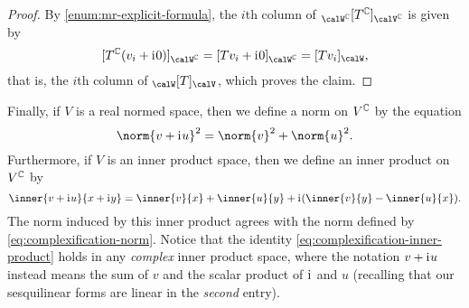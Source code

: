 \begin{proof}
    By \cref{enum:mr-explicit-formula}, the $i$th column of $\mr{\calW^\complex}{T^\complex}{\calV^\complex}$ is given by
    \begin{equation*}
        \coordvec{T^\complex (v_i + \iu 0)}{\calW^\complex}
            = \coordvec{Tv_i + \iu 0}{\calW^\complex}
            = \coordvec{Tv_i}{\calW},
    \end{equation*}
    that is, the $i$th column of $\mr{\calW}{T}{\calV}$, which proves the claim.
\end{proof}


Finally, if $V$ is a real normed space, then we define a norm on $V^{\mathbb{C}}$ by the equation
%
\begin{equation}
    \label{eq:complexification-norm}
    \norm{v + \iu u}^2
        = \norm{v}^2 + \norm{u}^2.
\end{equation}
%
Furthermore, if $V$ is an inner product space, then we define an inner product on $V^{\mathbb{C}}$ by
%
\begin{equation}
    \label{eq:complexification-inner-product}
    \inner{v + \iu u}{x + \iu y}
        = \inner{v}{x}
          + \inner{u}{y}
          + \iu (\inner{v}{y} - \inner{u}{x}).
\end{equation}
%
The norm induced by this inner product agrees with the norm defined by \cref{eq:complexification-norm}. Notice that the identity \cref{eq:complexification-inner-product} holds in any \emph{complex} inner product space, where the notation $v + \mathrm{i}\mkern1mu u$ instead means the sum of $v$ and the scalar product of $\mathrm{i}\mkern1mu$ and $u$ (recalling that our sesquilinear forms are linear in the \emph{second} entry).